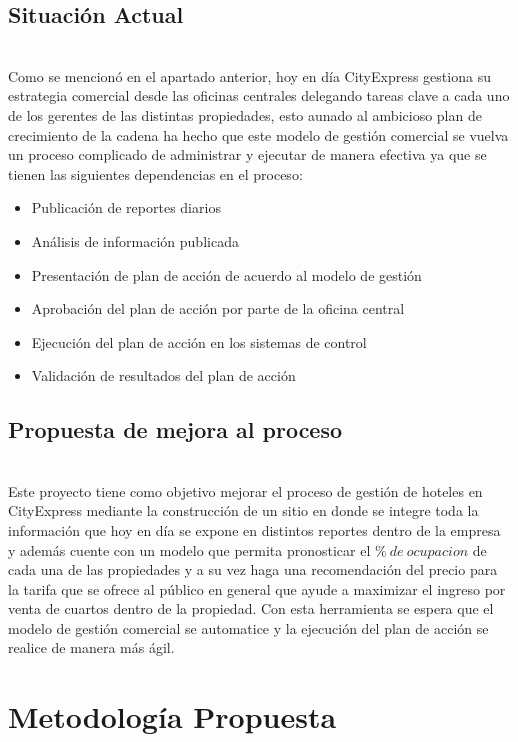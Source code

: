 \documentclass{article}\usepackage[]{graphicx}\usepackage[]{color}
\begin{document}
\subsection{Situación Actual}
~\\
Como se mencionó en el apartado anterior, hoy en día CityExpress gestiona su estrategia comercial desde las oficinas centrales delegando tareas clave a cada uno de los gerentes de las distintas propiedades, esto aunado al ambicioso plan de crecimiento de la cadena ha hecho que este modelo de gestión comercial se vuelva un proceso complicado de administrar y ejecutar de manera efectiva ya que se tienen las siguientes dependencias en el proceso:
\begin{itemize}[noitemsep]
\item Publicación de reportes diarios
\item Análisis de información publicada
\item Presentación de plan de acción de acuerdo al modelo de gestión
\item Aprobación del plan de acción por parte de la oficina central
\item Ejecución del plan de acción en los sistemas de control
\item Validación de resultados del plan de acción
\end{itemize}
\subsection{Propuesta de mejora al proceso}
~\\
Este proyecto tiene como objetivo mejorar el proceso de gestión de hoteles en CityExpress mediante la construcción de un sitio en donde se integre toda la información que hoy en día se expone en distintos reportes dentro de la empresa y además cuente con un modelo que permita pronosticar el $\%\ de\ ocupacion$ de cada una de las propiedades y a su vez haga una recomendación del precio para la tarifa que se ofrece al público en general que ayude a maximizar el ingreso por venta de cuartos dentro de la propiedad.
Con esta herramienta se espera que el modelo de gestión comercial se automatice y la ejecución del plan de acción se realice de manera más ágil.
\section{Metodología Propuesta}
\end{document}
